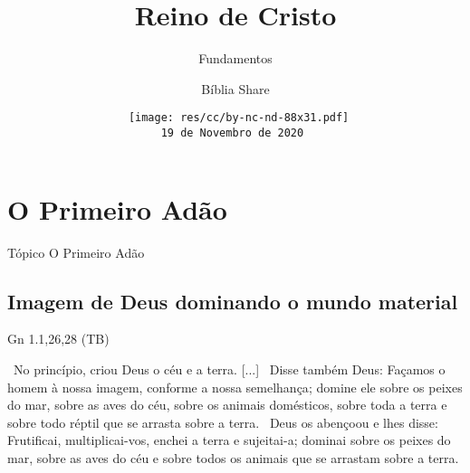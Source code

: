 \documentclass[12pt,aspectratio=169]{beamer}
\title{Reino de Cristo}
\subtitle{Fundamentos}
\author{Bíblia Share}
\date[{\tiny\tt 19 de Novembro de 2020}]{{\scriptsize\tt%
    \texttt{[image: res/cc/by-nc-nd-88x31.pdf]}\\[\smallskipamount]
    19 de Novembro de 2020
}}
\newcommand{\ver}[1]{%
    \raisebox{0.50ex}{%
        \scalebox{1.1}{%
            \pmb{\textbf{\textcolor{BSpbg}{#1}}}%
        }%
    }%
}
\newcommand{\QUOTE}[1]{%
    \par\noindent\hspace*{0.05\linewidth}%
    \begin{minipage}{0.9\linewidth}%
        \linespread{1.35}\large{#1}%
    \end{minipage}%
}
\newcommand{\YEL}[1]{{\textcolor{TXyel}{#1}}}
\newcommand{\CYA}[1]{{\textcolor{TXcya}{#1}}}
\newcommand{\MAG}[1]{{\textcolor{TXmag}{#1}}}
\begin{document}
\begin{frame}
    \titlepage
\end{frame}
\section{O Primeiro Adão}

    \begin{frame}
        \par\noindent\hspace*{0.05\linewidth}%
        \begin{minipage}{0.9\linewidth}%
            \linespread{1.35}\large%
            \begin{alertblock}{Tópico}
                O Primeiro Adão
            \end{alertblock}
        \end{minipage}%
    \end{frame}

    \subsection{Imagem de Deus dominando o mundo material}

    \begin{frame}{Gn 1.1,26,28 (TB)}
        \QUOTE{%
            \ver{1}~No princípio, criou Deus o \CYA{céu} e a \YEL{terra}. [...]
            \ver{26}~Disse também Deus: Façamos o \YEL{homem} \MAG{à nossa imagem}, conforme a
            \MAG{nossa semelhança}; \YEL{domine ele} sobre os peixes do mar, sobre as aves do
            céu, sobre os animais domésticos, \YEL{sobre toda a terra} e sobre todo réptil que
            se arrasta sobre a terra.
            \ver{28}~Deus os abençoou e lhes disse: Frutificai, multiplicai-vos, \YEL{enchei a
            terra} e \YEL{sujeitai-a}; \YEL{dominai} sobre os peixes do mar, sobre as aves do
            céu e sobre todos os animais que se arrastam sobre a terra.
        }
    \end{frame}
\end{document}

